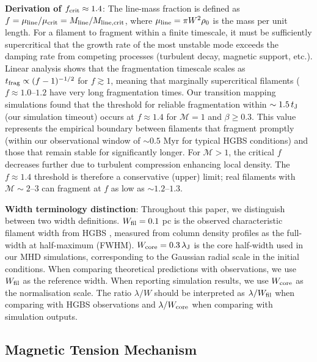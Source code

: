 \documentclass[twoside,twocolumn]{mnras}
\begin{document}
\textbf{Derivation of $f_{\rm crit} \approx 1.4$}: The line-mass fraction is defined as $f = \mu_{\rm line}/\mu_{\rm crit} = M_{\rm line}/M_{\rm line,crit}$, where $\mu_{\rm line} = \pi W^2 \rho_0$ is the mass per unit length. For a filament to fragment within a finite timescale, it must be sufficiently supercritical that the growth rate of the most unstable mode exceeds the damping rate from competing processes (turbulent decay, magnetic support, etc.). Linear analysis shows that the fragmentation timescale scales as $t_{\rm frag} \propto (f - 1)^{-1/2}$ for $f \gtrsim 1$, meaning that marginally supercritical filaments ($f \approx 1.0$--$1.2$ have very long fragmentation times. Our transition mapping simulations found that the threshold for reliable fragmentation within $\sim 1.5\,t_{\rm J}$ (our simulation timeout) occurs at $f \approx 1.4$ for $\mathcal{M} = 1$ and $\beta \geq 0.3$. This value represents the empirical boundary between filaments that fragment promptly (within our observational window of $\sim 0.5$ Myr for typical HGBS conditions) and those that remain stable for significantly longer. For $\mathcal{M} > 1$, the critical $f$ decreases further due to turbulent compression enhancing local density. The $f \approx 1.4$ threshold is therefore a conservative (upper) limit; real filaments with $\mathcal{M} \sim 2$--$3$ can fragment at $f$ as low as $\sim 1.2$--$1.3$.

\textbf{Width terminology distinction}: Throughout this paper, we distinguish between two width definitions. $W_{\rm fil} = 0.1$ pc is the observed characteristic filament width from HGBS \citep{Arzoumanian2011}, measured from column density profiles as the full-width at half-maximum (FWHM). $W_{\rm core} = 0.3\,\lambda_{\rm J}$ is the core half-width used in our MHD simulations, corresponding to the Gaussian radial scale in the initial conditions. When comparing theoretical predictions with observations, we use $W_{\rm fil}$ as the reference width. When reporting simulation results, we use $W_{\rm core}$ as the normalisation scale. The ratio $\lambda/W$ should be interpreted as $\lambda/W_{\rm fil}$ when comparing with HGBS observations and $\lambda/W_{\rm core}$ when comparing with simulation outputs.

\subsection{Magnetic Tension Mechanism}
\end{document}
